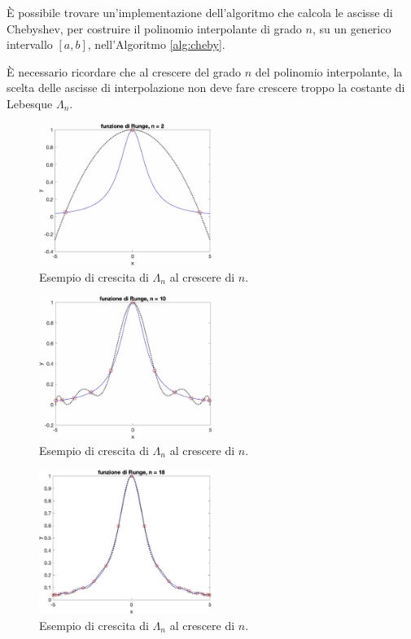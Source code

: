È possibile trovare un'implementazione dell'algoritmo che calcola le ascisse di Chebyshev, per costruire il polinomio interpolante di grado $n$, su un generico intervallo $[a, b]$, nell'Algoritmo \ref{alg:cheby}.

\begin{remark}
    È necessario ricordare che al crescere del grado $n$ del polinomio interpolante, la scelta delle ascisse di interpolazione non deve fare crescere troppo la costante di Lebesque $\Lambda_n$.
\end{remark}

\begin{figure}
    \centering
    \includegraphics[width=0.5\textwidth]{immagini/fRungeAscChebN=2.jpg}
    \caption{Esempio di crescita di $\Lambda_n$ al crescere di $n$.}\label{fig:fRungeAscChebN=2}
\end{figure}

\begin{figure}
    \centering
    \includegraphics[width=0.5\textwidth]{immagini/fRungeAscChebN=10.jpg}
    \caption{Esempio di crescita di $\Lambda_n$ al crescere di $n$.}\label{fig:fRungeAscChebN=10}
\end{figure}

\begin{figure}
    \centering
    \includegraphics[width=0.5\textwidth]{immagini/fRungeAscChebN=18.jpg}
    \caption{Esempio di crescita di $\Lambda_n$ al crescere di $n$.}\label{fig:fRungeAscChebN=18}
\end{figure}

